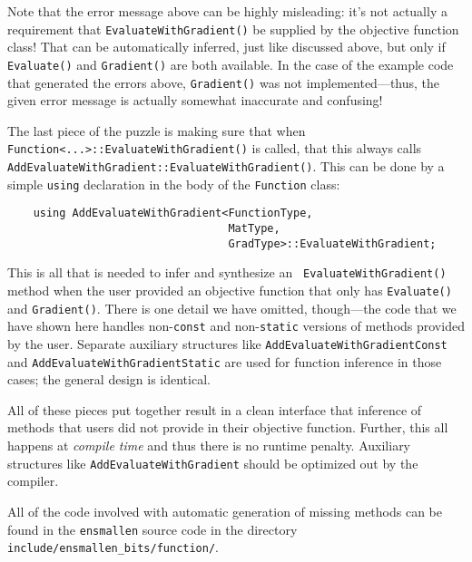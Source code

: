Note that the error message above can be highly misleading: it's not actually a
requirement that {\tt EvaluateWithGradient()} be supplied by the objective
function class!  That can be automatically inferred, just like discussed above,
but only if {\tt Evaluate()} and {\tt Gradient()} are both available.  In the
case of the example code that generated the errors above, {\tt Gradient()} was
not implemented---thus, the given error message is actually somewhat inaccurate
and confusing!

The last piece of the puzzle is making sure that when {\tt
Function<...>::EvaluateWithGradient()} is called, that this always calls {\tt
AddEvaluateWithGradient::EvaluateWithGradient()}.  This can be done by a simple
{\tt using} declaration in the body of the {\tt Function} class:

\begin{verbatim}
    using AddEvaluateWithGradient<FunctionType,
                                  MatType,
                                  GradType>::EvaluateWithGradient;
\end{verbatim}

This is all that is needed to infer and synthesize an {\tt
EvaluateWithGradient()} method when the user provided an objective function that
only has {\tt Evaluate()} and {\tt Gradient()}.  There is one detail we have
omitted, though---the code that we have shown here handles non-{\tt const}
and non-{\tt static} versions of methods provided by the user.  Separate
auxiliary structures like {\tt AddEvaluateWithGradientConst}
and {\tt AddEvaluateWithGradientStatic}
are used for function inference in those cases; the general design is identical.

All of these pieces put together result in a clean interface that inference of
methods that users did not provide in their objective function.  Further, this
all happens at {\it compile time} and thus there is no runtime penalty.
Auxiliary structures like {\tt AddEvaluateWithGradient} should be optimized out
by the compiler.

All of the code involved with automatic generation of missing methods can be
found in the {\tt ensmallen} source code in the directory {\tt
include/ensmallen\_bits/function/}.
